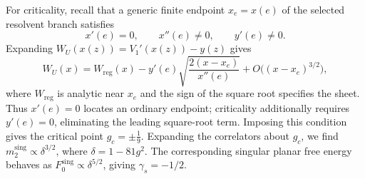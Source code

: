 For criticality, recall that a generic finite endpoint $x_e=x(e)$ of the selected resolvent branch
satisfies
\begin{equation}
    x'(e)=0,\qquad x''(e)\neq0,\qquad y'(e)\neq0.
\end{equation}
Expanding $W_U(x(z))=V_1'(x(z))-y(z)$ gives
\begin{equation}
    W_U(x)=W_{\mathrm{reg}}(x)
    -y'(e)\sqrt{\frac{2(x-x_e)}{x''(e)}}
    +O\bigl((x-x_e)^{3/2}\bigr),
    \label{eq:qtm-generic-edge}
\end{equation}
where $W_{\mathrm{reg}}$ is analytic near $x_e$ and the sign of the square root specifies the
sheet. Thus $x'(e)=0$ locates an ordinary endpoint; criticality additionally requires $y'(e)=0$,
eliminating the leading square-root term. Imposing this condition gives the critical point
$g_c=\pm\frac19$. Expanding the correlators about $g_c$, we find $m_2^{\mathrm{sing}}\propto\delta^{3/2}$, where $\delta=1-81g^2$. The corresponding singular planar free energy behaves as $F_0^{\mathrm{sing}}\propto\delta^{5/2}$, giving $\gamma_s=-1/2$.
